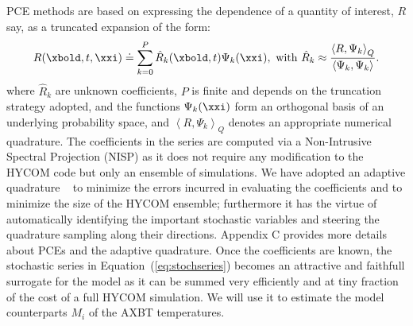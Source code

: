 PCE methods \citep{LeMaitreKnio2010} are based on expressing the dependence 
of a quantity of
interest, $R$ say, as a truncated expansion of the form:
\begin{equation}
  R(\xbold,t,\xxi) \doteq \sum_{k = 0}^P \hat{R}_k(\xbold,t) \Psi_k(\xxi),
\mbox{ with }
 \hat{R}_k \approx \frac{\left< R, \Psi_k \right>_Q}{\left< \Psi_k, \Psi_k \right>} .
\label{eq:stochseries}
\end{equation}
where $\hat{R}_k$ are unknown coefficients, $P$ is finite and depends on
the truncation strategy adopted, and the functions $\Psi_k(\xxi)$ form
an orthogonal basis of an underlying probability space, and $\left<
R, \Psi_k \right>_Q$ denotes an appropriate numerical quadrature.
The coefficients in the series are computed via a Non-Intrusive
Spectral Projection (NISP) as it does not require any modification to
the HYCOM code but only an ensemble of simulations. We have adopted an adaptive quadrature ~\citep{Constantine:2012,winokur:2012,conrad:2012}
to minimize the errors incurred in evaluating the
coefficients and to minimize the size of the HYCOM ensemble; furthermore
it has the virtue of automatically identifying the important stochastic
variables and steering the quadrature sampling along their directions.
Appendix C provides more details about PCEs and the adaptive quadrature.
Once the coefficients are known, the stochastic series in Equation~(\ref{eq:stochseries}) 
becomes an attractive and
faithfull surrogate for the model as it can be summed very efficiently
and at tiny fraction of the cost of a full HYCOM simulation. We will
use it to estimate the model counterparts $M_i$ of the AXBT temperatures.
